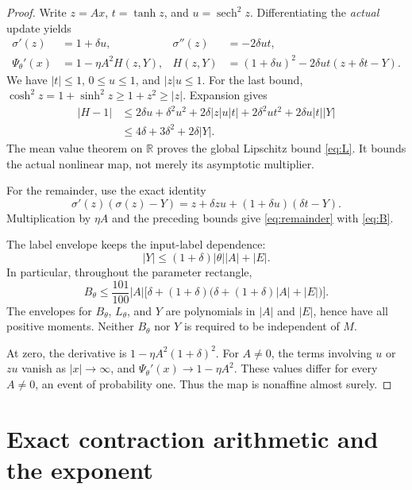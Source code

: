 \documentclass[11pt,a4paper]{article}
\numberwithin{equation}{section}
\theoremstyle{remark}
\DeclareMathOperator{\sech}{sech}
\newcommand{\R}{\mathbb R}
\begin{document}
\begin{proof}
Write $z=Ax$, $t=\tanh z$, and $u=\sech^2 z$. Differentiating the
\emph{actual} update yields
\begin{align}
 \sigma'(z)&=1+\delta u,&\sigma''(z)&=-2\delta ut,\nonumber\\
 \Psi_\theta'(x)&=1-\eta A^2 H(z,Y),&
 H(z,Y)&=(1+\delta u)^2-2\delta ut(z+\delta t-Y).
 \label{eq:derivative}
\end{align}
We have $|t|\le1$, $0\le u\le1$, and $|z|u\le1$. For the last bound,
$\cosh^2 z=1+\sinh^2 z\ge1+z^2\ge|z|$. Expansion gives
\begin{align}
 |H-1|&\le2\delta u+\delta^2u^2+2\delta|z|u|t|
              +2\delta^2ut^2+2\delta u|t||Y|\nonumber\\
       &\le4\delta+3\delta^2+2\delta|Y|.\label{eq:H-bound}
\end{align}
The mean value theorem on $\R$ proves the global Lipschitz bound
\eqref{eq:L}. It bounds the actual nonlinear map, not merely its
asymptotic multiplier.

For the remainder, use the exact identity
\begin{equation}
 \sigma'(z)(\sigma(z)-Y)
   =z+\delta zu+(1+\delta u)(\delta t-Y).
 \label{eq:gradient-expansion}
\end{equation}
Multiplication by $\eta A$ and the preceding bounds give
\eqref{eq:remainder} with \eqref{eq:B}.

The label envelope keeps the input-label dependence:
\begin{equation}
 |Y|\le(1+\delta)|\theta||A|+|E|.
 \label{eq:label-envelope}
\end{equation}
In particular, throughout the parameter rectangle,
\begin{equation}
 B_\theta\le\frac{101}{100}|A|
 \bigl[\delta+(1+\delta)\bigl(\delta+(1+\delta)|A|+|E|\bigr)\bigr].
 \label{eq:uniform-B}
\end{equation}
The envelopes for $B_\theta$, $L_\theta$, and $Y$ are polynomials in
$|A|$ and $|E|$, hence have all positive moments. Neither $B_\theta$ nor
$Y$ is required to be independent of $M$.

At zero, the derivative is $1-\eta A^2(1+\delta)^2$. For $A\ne0$,
the terms involving $u$ or $zu$ vanish as $|x|\to\infty$, and
$\Psi_\theta'(x)\to1-\eta A^2$. These values differ for every $A\ne0$,
an event of probability one. Thus the map is nonaffine almost surely.
\end{proof}

\section{Exact contraction arithmetic and the exponent}\label{sec:exponent}
\end{document}
